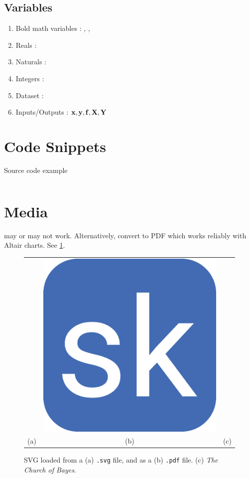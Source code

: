 \documentclass{article}
\begin{document}
\subsection{Variables}
\begin{enumerate}%
\item Bold math variables \vrb{\mbf{}}: \mbf{\Sigma}, ,
\item Reals \vrb{\reals}: \reals
\item Naturals \vrb{\naturals}: \naturals
\item Integers \vrb{\ints}: \ints
\item Dataset \vrb{\dset}: \dset
\item Inputs/Outputs \vrb{\xvec,\yvec,\fvec,\Xvec,\Yvec}: ${\boldsymbol{\mathbf{x}}},{\boldsymbol{\mathbf{y}}},{\boldsymbol{\mathbf{f}}},{\boldsymbol{\mathbf{X}}},{\boldsymbol{\mathbf{Y}}}$
\end{enumerate}

\section{Code Snippets}

\begin{code}
\caption{Source code example} \label{code:sample}
\inputminted[firstline=1,lastline=2,fontsize=\small]{python}{test.py}
\end{code}

\section{Media}

\vrb{} may or may not work. Alternatively, convert to PDF which works reliably with Altair charts. See \cref{fig:svg_pdf}.

\begin{figure}[ht]
    \centering
    \begin{tabular}{ccc}
         & \includegraphics[width=0.15\linewidth]{favicon.pdf} &
         \\
        (a) & (b) & (c)
    \end{tabular}
    \caption{SVG loaded from a (a) \texttt{.svg} file, and as a (b) \texttt{.pdf} file. (c) \emph{The Church of Bayes}. }
    \label{fig:svg_pdf}
\end{figure}    
\end{document}
